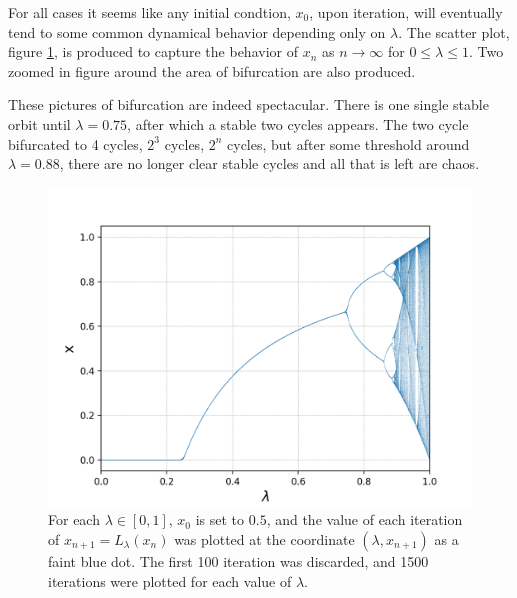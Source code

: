 \documentclass{report}
\theoremstyle{definition}
\theoremstyle{definition}
\theoremstyle{remark}
\begin{document}
For all cases it seems like any initial condtion, $x_0$, upon iteration, will eventually tend to some common dynamical behavior depending only on $\lambda$.
The scatter plot, figure \ref{fig:logistic bifurcation overview}, is produced to capture the behavior of $x_n$ as $n \rightarrow \infty$ for $0 \leq \lambda \leq 1$. 
Two zoomed in figure around the area of bifurcation are also produced.

These pictures of bifurcation are indeed spectacular. 
There is one single stable orbit until $\lambda = 0.75$, after which a stable two cycles appears.
The two cycle bifurcated to 4 cycles, $2^3$ cycles, $2^n$ cycles, but after some threshold around $\lambda = 0.88$, there are no longer clear stable cycles and all that is left are chaos. 


\begin{figure}[htbp]
	\centering
	\label{fig:logistic bifurcation overview}
	\includegraphics[width=\textwidth]{./figures/l_bifurcation_overview.png}
	\caption{For each $\lambda \in [0,1]$, $x_0$ is set to $0.5$, and the value of each iteration of $x_{n+1} = L_{\lambda}(x_n)$ was plotted at the coordinate $(\lambda, x_{n+1})$ as a faint blue dot. 
	The first 100 iteration was discarded, and 1500 iterations were plotted for each value of $\lambda$.}
\end{figure}
\end{document}
